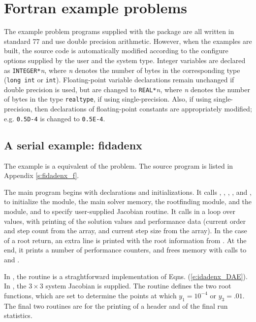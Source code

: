 \section{Fortran example problems}\label{s:ex_fortran}

The {\F} example problem programs supplied with the {\ida}
package are all written in standard {\F}77 and use double precision
arithmetic. However, when the {\F} examples are built, the source code is
automatically modified according to the configure options supplied by the
user and the system type. Integer variables are declared as {\tt INTEGER*}{\em n},
where {\em n} denotes the number of bytes in the corresponding {\C} type
({\tt long int} or {\tt int}). Floating-point variable declarations remain
unchanged if double precision is used, but are changed to {\tt REAL*}{\em n},
where {\em n} denotes the number of bytes in the {\sundials} type {\tt realtype},
if using single-precision. Also, if using single-precision, then declarations of
floating-point constants are appropriately modified; e.g. {\tt 0.5D-4} is
changed to {\tt 0.5E-4}.


\subsection{A serial example: fidadenx}\label{ss:fidadenx}

The  example is a {\F} equivalent of the  problem.
The source program  is listed in Appendix \ref{s:fidadenx_f}.

The main program begins with declarations and initializations.  It calls 
, , , , and
, to initialize the {\nvecs} module, the main
solver memory, the rootfinding module, and the {\idadense} module, and
to specify user-supplied Jacobian routine.
It calls  in a loop over  values, with printing of
the solution values and performance data (current order and step count
from the  array, and current step size from the  array).
In the case of a root return, an extra line is printed with the root
information from .  At the end, it prints a number of
performance counters, and frees memory with calls to 
and .

In , the  routine is a straghtforward
implementation of Eqns. (\ref{e:idadenx_DAE}).  In , the 
$3 \times 3$ system Jacobian is supplied.  The  routine
defines the two root functions, which are set to determine the points at which
$y_1 = 10^{-4}$ or $y_3 = .01$.  The final two routines are for the
printing of a header and of the final run statistics.

